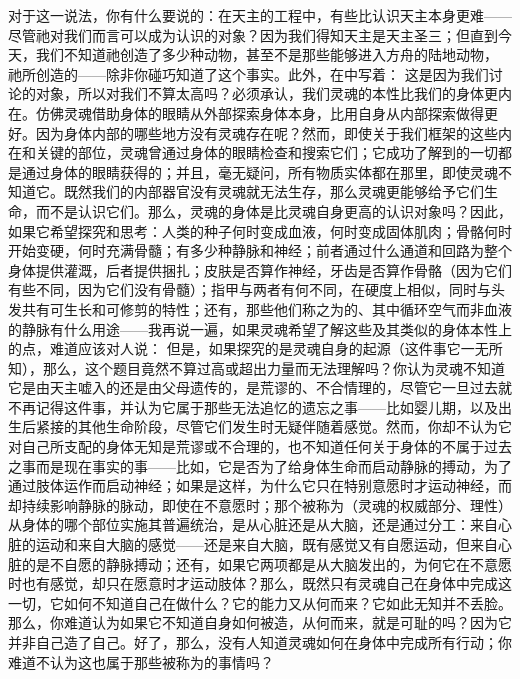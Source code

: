 对于这一说法，你有什么要说的：在天主的工程中，有些比认识天主本身更难——尽管祂对我们而言可以成为认识的对象？因为我们得知天主是天主圣三；但直到今天，我们不知道祂创造了多少种动物，甚至不是那些能够进入方舟的陆地动物， 祂所创造的——除非你碰巧知道了这个事实。此外，在中写着：  这是因为我们讨论的对象，所以对我们不算太高吗？必须承认，我们灵魂的本性比我们的身体更内在。仿佛灵魂借助身体的眼睛从外部探索身体本身，比用自身从内部探索做得更好。因为身体内部的哪些地方没有灵魂存在呢？然而，即使关于我们框架的这些内在和关键的部位，灵魂曾通过身体的眼睛检查和搜索它们；它成功了解到的一切都是通过身体的眼睛获得的；并且，毫无疑问，所有物质实体都在那里，即使灵魂不知道它。既然我们的内部器官没有灵魂就无法生存，那么灵魂更能够给予它们生命，而不是认识它们。那么，灵魂的身体是比灵魂自身更高的认识对象吗？因此，如果它希望探究和思考：人类的种子何时变成血液，何时变成固体肌肉；骨骼何时开始变硬，何时充满骨髓；有多少种静脉和神经；前者通过什么通道和回路为整个身体提供灌溉，后者提供捆扎；皮肤是否算作神经，牙齿是否算作骨骼（因为它们有些不同，因为它们没有骨髓）；指甲与两者有何不同，在硬度上相似，同时与头发共有可生长和可修剪的特性；还有，那些他们称之为的、其中循环空气而非血液的静脉有什么用途——我再说一遍，如果灵魂希望了解这些及其类似的身体本性上的点，难道应该对人说： 但是，如果探究的是灵魂自身的起源（这件事它一无所知），那么，这个题目竟然不算过高或超出力量而无法理解吗？你认为灵魂不知道它是由天主嘘入的还是由父母遗传的，是荒谬的、不合情理的，尽管它一旦过去就不再记得这件事，并认为它属于那些无法追忆的遗忘之事——比如婴儿期，以及出生后紧接的其他生命阶段，尽管它们发生时无疑伴随着感觉。然而，你却不认为它对自己所支配的身体无知是荒谬或不合理的，也不知道任何关于身体的不属于过去之事而是现在事实的事——比如，它是否为了给身体生命而启动静脉的搏动，为了通过肢体运作而启动神经；如果是这样，为什么它只在特别意愿时才运动神经，而却持续影响静脉的脉动，即使在不意愿时；那个被称为（灵魂的权威部分、理性）从身体的哪个部位实施其普遍统治，是从心脏还是从大脑，还是通过分工：来自心脏的运动和来自大脑的感觉——还是来自大脑，既有感觉又有自愿运动，但来自心脏的是不自愿的静脉搏动；还有，如果它两项都是从大脑发出的，为何它在不意愿时也有感觉，却只在愿意时才运动肢体？那么，既然只有灵魂自己在身体中完成这一切，它如何不知道自己在做什么？它的能力又从何而来？它如此无知并不丢脸。那么，你难道认为如果它不知道自身如何被造，从何而来，就是可耻的吗？因为它并非自己造了自己。好了，那么，没有人知道灵魂如何在身体中完成所有行动；你难道不认为这也属于那些被称为的事情吗？\par

